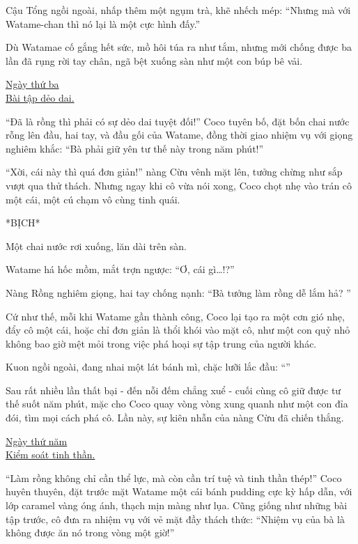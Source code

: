 \documentclass[../main.tex]{subfiles}
\begin{document}
Cậu Tổng ngồi ngoài, nhấp thêm một ngụm trà, khẽ nhếch mép: ``Nhưng mà với Watame-chan thì nó lại là một cực hình đấy.''

Dù Watamae cố gắng hết sức, mồ hôi túa ra như tắm, nhưng mới chống được ba lần đã rụng rời tay chân, ngã bệt xuống sàn như một con búp bê vải.

\begin{center}
  \uline{Ngày thứ ba\\Bài tập dẻo dai.}
\end{center}

``Đã là rồng thì phải có sự dẻo dai tuyệt đối!'' Coco tuyên bố, đặt bốn chai nước rỗng lên đầu, hai tay, và đầu gối của Watame, đồng thời giao nhiệm vụ với giọng nghiêm khắc: ``Bà phải giữ yên tư thế này trong năm phút!''

``Xời, cái này thì quá đơn giản!'' nàng Cừu vênh mặt lên, tưởng chừng như sắp vượt qua thử thách. Nhưng ngay khi cô vừa nói xong, Coco chọt nhẹ vào trán cô một cái, một cú chạm vô cùng tinh quái.

*BỊCH*

Một chai nước rơi xuống, lăn dài trên sàn.

Watame há hốc mồm, mắt trợn ngược: ``Ơ, cái gì\dots!?''

Nàng Rồng nghiêm giọng, hai tay chống nạnh: ``Bà tưởng làm rồng dễ lắm hả? ''

Cứ như thế, mỗi khi Watame gần thành công, Coco lại tạo ra một cơn gió nhẹ, đẩy cô một cái, hoặc chỉ đơn giản là thổi khói vào mặt cô, như một con quỷ nhỏ không bao giờ mệt mỏi trong việc phá hoại sự tập trung của người khác.

Kuon ngồi ngoài, đang nhai một lát bánh mì, chặc lưỡi lắc đầu: ``''

Sau rất nhiều lần thất bại - đến nỗi đếm chẳng xuể - cuối cùng cô giữ được tư thế suốt năm phút, mặc cho Coco quay vòng vòng xung quanh như một con đỉa đói, tìm mọi cách phá cô. Lần này, sự kiên nhẫn của nàng Cừu đã chiến thắng.

\begin{center}
  \uline{Ngày thứ năm\\Kiểm soát tinh thần.}
\end{center}

``Làm rồng không chỉ cần thể lực, mà còn cần trí tuệ và tinh thần thép!'' Coco huyên thuyên, đặt trước mặt Watame một cái bánh pudding cực kỳ hấp dẫn, với lớp caramel vàng óng ánh, thạch mịn màng như lụa. Cũng giống như những bài tập trước, cô đưa ra nhiệm vụ với vẻ mặt đầy thách thức: ``Nhiệm vụ của bà là không được ăn nó trong vòng một giờ!''
\end{document}
